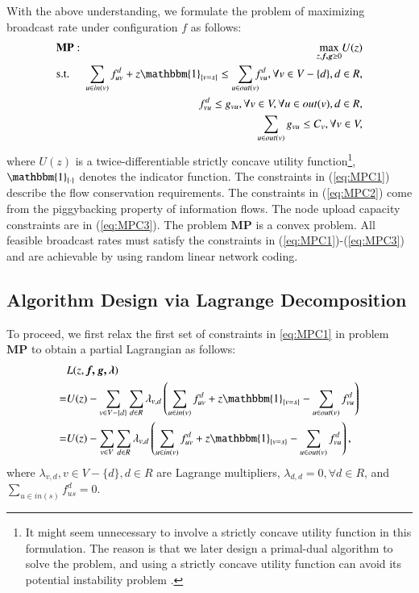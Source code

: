 \documentclass[10pt,conference]{IEEEtran}
\begin{document}
With the above understanding, we formulate the problem of maximizing
broadcast rate under configuration $f$ as follows: \begin{eqnarray}
 & \mathbf{MP:} & \underset{z,\boldsymbol{f,g}\ge0}{\max}U(z)\label{eq:MP}\\
 & \mbox{s.t.} & \!\!\!\sum_{u\in in(v)}f_{uv}^{d}+z\mathbbm{1}_{\left\{ v=s\right\} }\leq\sum_{u\in out(v)}\!\!\! f_{vu}^{d},\forall v\in V-\{d\},d\in R,\label{eq:MPC1}\\
 &  & f_{vu}^{d}\leq g_{vu},\forall v\in V,\forall u\in out(v),d\in R,\label{eq:MPC2}\\
 &  & \!\!\!\sum_{u\in out(v)}g_{vu}\leq C_{v},\forall v\in V,\label{eq:MPC3}\end{eqnarray}
 where $U\left(z\right)$ is a twice-differentiable strictly concave
utility function\footnote{It might seem unnecessary to involve a strictly concave utility
function in this formulation. The reason is that we later design a
primal-dual algorithm to solve the problem, and using a strictly concave
utility function can avoid its potential instability problem \cite{chen2008ump}.}, $\mathbbm{1}_{\{\cdot\}}$ denotes the indicator function. The constraints
in (\ref{eq:MPC1}) describe the flow conservation requirements. The constraints in (\ref{eq:MPC2}) come from the piggybacking
property of information flows. The node upload capacity constraints
are in (\ref{eq:MPC3}). The problem $\mathbf{MP}$ is a convex problem.
All feasible broadcast rates must satisfy the constraints in (\ref{eq:MPC1})-(\ref{eq:MPC3})
and are achievable by using random linear network coding.

\subsection{Algorithm Design via Lagrange Decomposition}

To proceed, we first relax the first set of constraints in \eqref{eq:MPC1}
in problem $\mathbf{MP}$ to obtain a partial Lagrangian as follows:
\begin{align}
  & L(z,\boldsymbol{f,g,\lambda})\nonumber \\
= & U(z)-\sum_{v\in V-\{d\}}\sum_{d\in R}\lambda_{v,d}\left(\sum_{u\in in(v)}f_{uv}^{d}+z\mathbbm{1}_{\left\{ v=s\right\} }-\sum_{u\in out(v)}f_{vu}^{d}\right)\nonumber \\
= & U(z)-\sum_{v\in V}\sum_{d\in R}\lambda_{v,d}\left(\sum_{u\in in(v)}f_{uv}^{d}+z\mathbbm{1}_{\left\{ v=s\right\} }-\sum_{u\in out(v)}f_{vu}^{d}\right),\label{eq:partial.lag}\end{align}
 where $\lambda_{v,d},v\in V-\{d\},d\in R$ are Lagrange multipliers,
$\lambda_{d,d}=0,\forall d\in R$, and $\sum_{u\in in(s)}f_{us}^{d}=0$.
\end{document}
